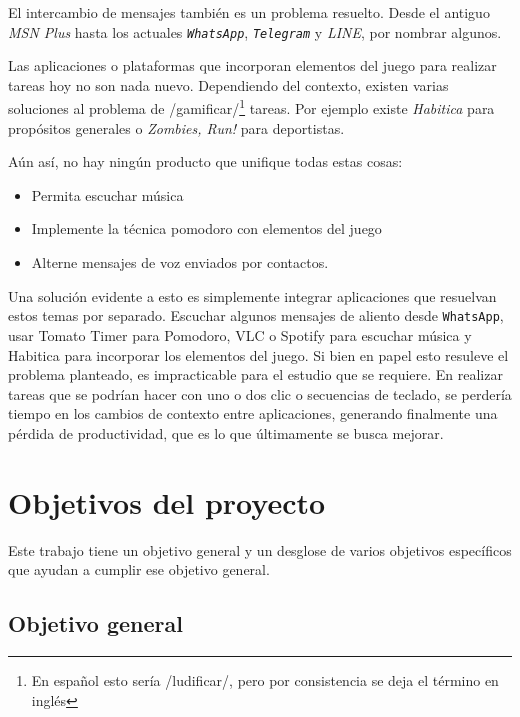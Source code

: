 \documentclass[12pt,letterpaper]{report}
\providecommand{\tightlist}{%
  \setlength{\itemsep}{0pt}\setlength{\parskip}{0pt}}
\begin{document}
El intercambio de mensajes también es un problema resuelto. Desde el
antiguo \emph{MSN Plus} hasta los actuales \emph{\texttt{WhatsApp}},
\emph{\texttt{Telegram}} y \emph{LINE}, por nombrar algunos.

Las aplicaciones o plataformas que incorporan elementos del juego para
realizar tareas hoy no son nada nuevo. Dependiendo del contexto, existen
varias soluciones al problema de /gamificar/\footnote{En español esto
  sería /ludificar/, pero por consistencia se deja el término en inglés}
tareas. Por ejemplo existe \emph{Habitica} para propósitos generales o
\emph{Zombies, Run!} para deportistas.

Aún así, no hay ningún producto que unifique todas estas cosas:

\begin{itemize}
\tightlist
\item
  Permita escuchar música
\item
  Implemente la técnica pomodoro con elementos del juego
\item
  Alterne mensajes de voz enviados por contactos.
\end{itemize}

Una solución evidente a esto es simplemente integrar aplicaciones que
resuelvan estos temas por separado. Escuchar algunos mensajes de aliento
desde \texttt{WhatsApp}, usar Tomato Timer para Pomodoro, VLC o Spotify para
escuchar música y Habitica para incorporar los elementos del juego. Si
bien en papel esto resuleve el problema planteado, es impracticable para
el estudio que se requiere. En realizar tareas que se podrían hacer con
uno o dos clic o secuencias de teclado, se perdería tiempo en los
cambios de contexto entre aplicaciones, generando finalmente una pérdida
de productividad, que es lo que últimamente se busca mejorar.

\newpage
\hypertarget{objetivos-del-proyecto}{%
\section{Objetivos del proyecto}\label{objetivos-del-proyecto}}

Este trabajo tiene un objetivo general y un desglose de varios objetivos
específicos que ayudan a cumplir ese objetivo general.

\hypertarget{objetivo-general}{%
\subsection{Objetivo general}\label{objetivo-general}}
\end{document}
